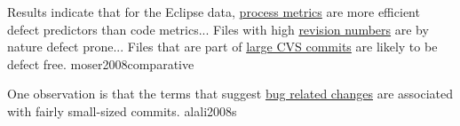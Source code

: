 \documentclass{article}
\begin{document}
  {Results indicate that for the Eclipse data, \ul{process metrics} are more efficient defect predictors than code metrics... Files with high \ul{revision numbers} are by nature defect prone... Files that are part of \ul{large CVS commits} are likely to be defect free.}
  {moser2008comparative}


  {One observation is that the terms that suggest \ul{bug related changes} are associated with fairly small-sized commits.}
  {alali2008s}

\end{document}
